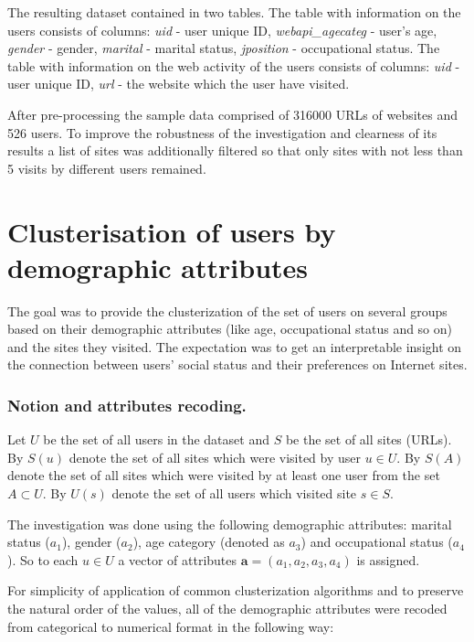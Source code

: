 \documentclass[runningheads,a4paper]{llncs}
\begin{document}
The resulting dataset contained in two tables. The table with information on the users consists of columns: \textit{uid} - user unique ID, \textit{webapi\_agecateg} - user's age, \textit{gender} - gender, \textit{marital} - marital status, \textit{jposition} - occupational status. The table with information on the web activity of the users consists of columns: \textit{uid} - user unique ID, \textit{url} - the website which the user have visited.


After pre-processing the sample data comprised of 316000 URLs of websites and 526 users. To improve the robustness of the investigation and clearness of its results a list of sites was additionally filtered so that only sites with not less than 5 visits by different users remained.



\section{Clusterisation of users by demographic attributes}

The goal was to provide the clusterization of the set of users on several groups based on their demographic attributes (like age, occupational status and so on) and the sites they visited. The expectation was to get an interpretable insight on the connection between users' social status and their preferences on Internet sites. 





\subsubsection{Notion and attributes recoding.}

Let $U$ be the set of all users in the dataset and $S$ be the set of all sites (URLs). By $S(u)$ denote the set of all sites which were visited by user $u \in U$. By $S(A)$ denote the set of all sites which were visited by at least one user from the set $A \subset U$. By $U(s)$ denote the set of all users which visited site $s \in S$.


The investigation was done using the following demographic attributes: marital status ($a_1$), gender ($a_2$), age category (denoted as $a_3$) and occupational status ($a_4$). So to each $u \in U$ a vector of attributes $\boldsymbol{a} = (a_1, a_2, a_3, a_4)$ is assigned.

For simplicity of application of common clusterization algorithms and to preserve the natural order of the values, all of the demographic attributes were recoded from categorical to numerical format in the following way:
\end{document}
